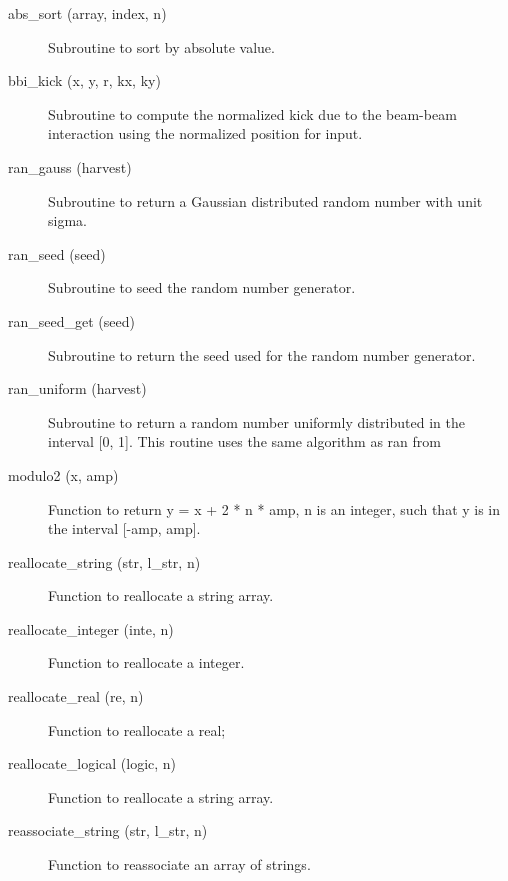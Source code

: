 \begin{description}

\item[abs\_sort (array, index, n)] \Newline 
  Subroutine to sort by absolute value.

\item[bbi\_kick (x, y, r, kx, ky)] \Newline 
Subroutine to compute the normalized kick due to the beam-beam
interaction using the normalized position for input.

\item[ran\_gauss (harvest)] \Newline 
Subroutine to return a Gaussian distributed random number with unit sigma.

\item[ran\_seed (seed)] \Newline 
Subroutine to seed the random number generator. 

\item[ran\_seed\_get (seed)] \Newline 
Subroutine to return the seed used for the random number generator.

\item[ran\_uniform (harvest)] \Newline 
Subroutine to return a random number uniformly distributed in the 
interval [0, 1]. This routine uses the same algorithm as ran from

\item[modulo2 (x, amp)] \Newline 
Function to return y = x + 2 * n * amp, n is an integer, such that y is 
in the interval [-amp, amp].

\item[reallocate\_string (str, l\_str, n)] \Newline 
Function to reallocate a string array.

\item[reallocate\_integer (inte, n)] \Newline 
Function to reallocate a integer.

\item[reallocate\_real (re, n)] \Newline 
Function to reallocate a real;

\item[reallocate\_logical (logic, n)] \Newline 
Function to reallocate a string array.

\item[reassociate\_string (str, l\_str, n)] \Newline 
Function to reassociate an array of strings.


\end{description}
